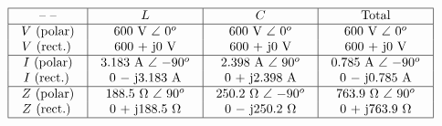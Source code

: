 






$$\vbox{\offinterlineskip
\halign{\strut
\vrule \quad\hfil # \ \hfil & 
\vrule \quad\hfil # \ \hfil & 
\vrule \quad\hfil # \ \hfil & 
\vrule \quad\hfil # \ \hfil \vrule \cr
\noalign{\hrule}
%
 -- -- & $L$ & $C$ & Total \cr
%
\noalign{\hrule}
%
$V$ (polar) & 600 V $\angle$ 0$^{o}$ & 600 V $\angle$ 0$^{o}$ & 600 V $\angle$ 0$^{o}$ \cr
$V$ (rect.) & 600 + j0 V & 600 + j0 V & 600 + j0 V \cr
%
\noalign{\hrule}
%
$I$ (polar) & 3.183 A $\angle$ $-90^o$ & 2.398 A $\angle$ 90$^{o}$ & 0.785 A $\angle$ $-90^o$ \cr
$I$ (rect.) & 0 $-$ j3.183 A & 0 + j2.398 A & 0 $-$ j0.785 A \cr
%
\noalign{\hrule}
%
$Z$ (polar) & 188.5 $\Omega$ $\angle$ $90^{o}$ & 250.2 $\Omega$ $\angle$ $-90^o$ & 763.9 $\Omega$ $\angle$ 90$^{o}$ \cr
$Z$ (rect.) & 0 + j188.5 $\Omega$ & 0 $-$ j250.2 $\Omega$ & 0 + j763.9 $\Omega$  \cr
%
\noalign{\hrule}
} %
}$$ %




